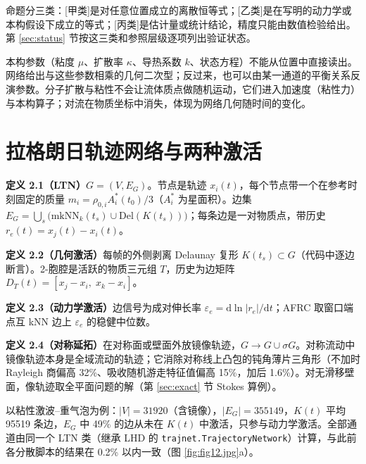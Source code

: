 \documentclass[11pt,a4paper]{article}
\newcommand{\prop}[2]{\par\smallskip\noindent\textbf{#1}\quad #2\par\smallskip}
\newcommand{\jia}{[甲类]}\newcommand{\yi}{[乙类]}\newcommand{\bing}{[丙类]}
\begin{document}
命题分三类：\jia 是对任意位置成立的离散恒等式；\yi 是在写明的动力学或本构假设下成立的等式；\bing 是估计量或统计结论，精度只能由数值检验给出。第 \ref{sec:status} 节按这三类和参照层级逐项列出验证状态。

本构参数（粘度 $\mu$、扩散率 $\kappa$、导热系数 $k$、状态方程）不能从位置中直接读出。网络给出与这些参数相乘的几何二次型；反过来，也可以由某一通道的平衡关系反演参数。分子扩散与粘性不会让流体质点做随机运动，它们进入加速度（粘性力）与本构算子；对流在物质坐标中消失，体现为网络几何随时间的变化。

\section{拉格朗日轨迹网络与两种激活}
\prop{定义 2.1（LTN）}{$G=(V,E_G)$。节点是轨迹 $x_i(t)$，每个节点带一个在参考时刻固定的质量 $m_i=\rho_{0,i}A^*_i(t_0)/3$（$A^*_i$ 为星面积）。边集 $E_G=\bigcup_s\big(\mathrm{mkNN}_k(t_s)\cup\mathrm{Del}(K(t_s))\big)$；每条边是一对物质点，带历史 $r_e(t)=x_j(t)-x_i(t)$。}
\prop{定义 2.2（几何激活）}{每帧的外侧剥离 Delaunay 复形 $K(t_s)\subset G$（代码中逐边断言）。2-胞腔是活跃的物质三元组 $T$，历史为边矩阵 $D_T(t)=[x_j-x_i,\;x_k-x_i]$。}
\prop{定义 2.3（动力学激活）}{边信号为成对伸长率 $\varepsilon_e=\mathrm d\ln|r_e|/\mathrm dt$；AFRC 取窗口端点互 kNN 边上 $\varepsilon_e$ 的稳健中位数。}
\prop{定义 2.4（对称延拓）}{在对称面或壁面外放镜像轨迹，$G\to G\cup\sigma G$。对称流动中镜像轨迹本身是全域流动的轨迹；它消除对称线上凸包的钝角薄片三角形（不加时 Rayleigh 商偏高 32\%、吸收随机游走特征值偏高 15\%，加后 1.6\%）。对无滑移壁面，像轨迹取全平面问题的解（第 \ref{sec:exact} 节 Stokes 算例）。}
以粘性激波–重气泡为例：$|V|=31920$（含镜像），$|E_G|=355149$，$K(t)$ 平均 95519 条边，$E_G$ 中 49\% 的边从未在 $K(t)$ 中激活，只参与动力学激活。全部通道由同一个 LTN 类（继承 LHD 的 \texttt{trajnet.TrajectoryNetwork}）计算，与此前各分散脚本的结果在 0.2\% 以内一致（图 \ref{fig:fig12.jpg}a）。
\end{document}
